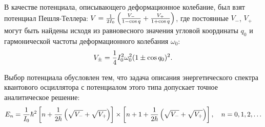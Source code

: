В качестве потенциала, описывающего деформационное колебание, был взят потенциал Пешля-Теллера: $V = \frac{1}{2I_0} \left( \frac{V_{-}}{1 - \cos q} + \frac{V_{+}}{1 + \cos q} \right)$, где постоянные $V_{-}$, $V_{+}$ могут быть найдены исходя из равновесного значения угловой координаты $q_0$ и гармонической частоты деформационного колебания $\omega_0$:
\vverh
\begin{gather}
V_{\pm} = \frac{1}{4} I_0^2 \omega_0^2 (1 \pm \cos q_0 )^2. \notag
\end{gather}

Выбор потенциала обусловлен тем, что задача описания энергетического спектра квантового осциллятора с потенциалом этого типа допускает точное аналитическое решение:
\vverh
\begin{gather}
E_n = \frac{1}{I_0} \hbar^2 \left[ n + \frac{1}{2 \hbar} \left( \sqrt{V_{-}} + \sqrt{V_{+}} \right) \right] \times \left[ n + 1 + \frac{1}{2 \hbar} \left( \sqrt{V_{-}} + \sqrt{V_{+}} \right) \right], \quad n = 0, 1, 2, \dots \notag 
\end{gather}



 